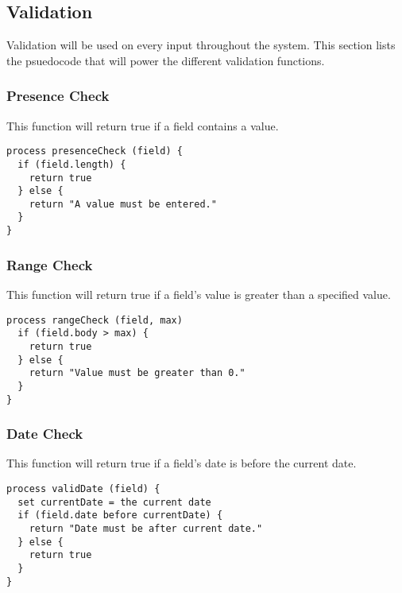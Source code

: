 \subsection{Validation}
Validation will be used on every input throughout the system. This section lists the psuedocode that will power the different validation functions.

\subsubsection{Presence Check}
This function will return true if a field contains a value.
\begin{verbatim}
process presenceCheck (field) {
  if (field.length) {
    return true
  } else {
    return "A value must be entered."
  }
}
\end{verbatim}

\subsubsection{Range Check}
This function will return true if a field's value is greater than a specified value.
\begin{verbatim}
process rangeCheck (field, max)
  if (field.body > max) {
    return true
  } else {
    return "Value must be greater than 0."
  }
}
\end{verbatim}

\subsubsection{Date Check}
This function will return true if a field's date is before the current date.
\begin{verbatim}
process validDate (field) {
  set currentDate = the current date
  if (field.date before currentDate) {
    return "Date must be after current date."
  } else {
    return true
  }
}
\end{verbatim}
